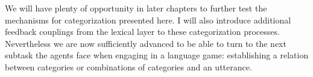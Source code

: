 We will have plenty of opportunity in later chapters
to further test the mechanisms for categorization 
presented here. I will also introduce 
additional feedback couplings from the lexical 
layer to these categorization processes. Nevertheless
we are now sufficiently advanced to be able to
turn to the next subtask the agents face when 
engaging in a language game: establishing a relation
between categories or combinations of categories and 
an utterance. 


